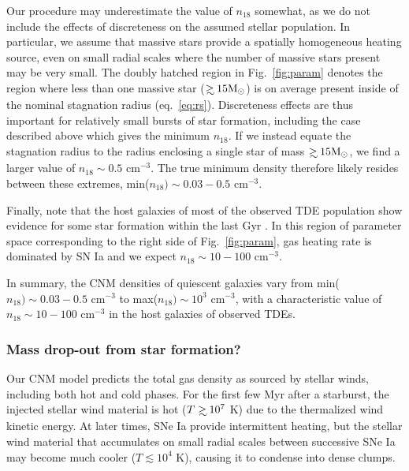 \documentclass[usenatbib,fleqn]{mnras}
\newcommand\gsim{\mathrel{\rlap{\lower4pt\hbox{\hskip1pt$\sim$}}
    \raise1pt\hbox{$>$}}}
\newcommand{\Msun}{{\rm M_\odot}}
\begin{document}
Our procedure may underestimate the value of $n_{18}$ somewhat, as we
do not include the effects of discreteness on the assumed stellar
population.  In particular, we assume that massive stars provide a
spatially homogeneous heating source, even on small radial scales where the
number of massive stars present may be very small.  The doubly hatched
region in Fig.~\ref{fig:param} denotes the region where less than one
massive star ($\gsim 15 \Msun$) is on average present inside of the
nominal stagnation radius (eq.~\ref{eq:rs}).  Discreteness effects are
thus important for relatively small bursts of star formation,
including the case described above which gives the minimum $n_{18}$.
If we instead equate the stagnation radius to the radius enclosing a
single star of mass $\gsim 15 \Msun$, we find a larger value of
$n_{18}\sim 0.5$ cm$^{-3}$.  The true
minimum density therefore likely resides between these extremes, min($n_{18})
\sim 0.03-0.5$ cm$^{-3}$.

Finally, note that the host galaxies of most of the observed TDE population show evidence for some
star formation within the last Gyr \citep{French+2016}.  In this
region of parameter space corresponding to the right side of
Fig.~\ref{fig:param}, gas heating rate is dominated by SN Ia and we
expect $n_{18}\sim 10-100$ cm$^{-3}$.

In summary, the CNM densities of quiescent galaxies vary from
min($n_{18}) \sim 0.03-0.5$ cm$^{-3}$ to max($n_{18})\sim 10^{3}$
cm$^{-3}$, with a characteristic value of $n_{18}\sim 10-100$
cm$^{-3}$ in the host galaxies of observed TDEs.

\subsubsection{Mass drop-out from star formation?}

Our CNM model predicts the total gas density as sourced by
stellar winds, including both hot and cold phases.  For the first few
Myr after a starburst, the injected stellar wind material is hot
($T\gsim 10^{7}$ K) due to the thermalized wind kinetic energy.
At later times, SNe Ia provide intermittent heating, but the stellar wind
material that accumulates on small radial scales between successive SNe Ia
may become much cooler ($T \lesssim 10^{4}$ K), causing it to condense
into dense clumps.
\end{document}

